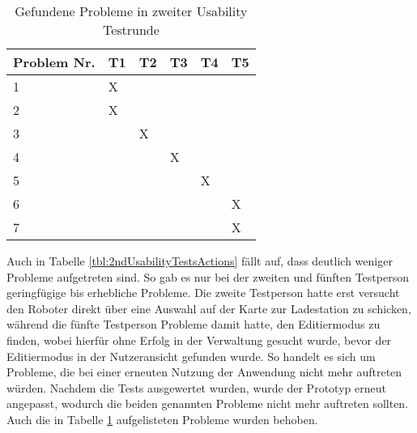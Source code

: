 \begin{table}[H]
    \caption{Gefundene Probleme in zweiter Usability Testrunde}\label{tbl:2ndUsabilityTestsProblems}
    \begin{tabular}{l|l|l|l|l|l}
        Problem Nr. & T1    & T2    & T3    & T4    & T5    \\ \hline
        1           & X     &       &       &       &       \\
        2           & X     &       &       &       &       \\
        3           &       & X     &       &       &       \\
        4           &       &       & X     &       &       \\
        5           &       &       &       & X     &       \\
        6           &       &       &       &       & X     \\
        7           &       &       &       &       & X     \\
    \end{tabular}    
\end{table}

Auch in Tabelle \ref{tbl:2ndUsabilityTestsActions} fällt auf, dass deutlich weniger Probleme aufgetreten sind. So gab es nur bei der zweiten und fünften Testperson geringfügige bis erhebliche Probleme. Die zweite Testperson hatte erst versucht den Roboter direkt über eine Auswahl auf der Karte zur Ladestation zu schicken, während die fünfte Testperson Probleme damit hatte, den Editiermodus zu finden, wobei hierfür ohne Erfolg in der Verwaltung gesucht wurde, bevor der Editiermodus in der Nutzeransicht gefunden wurde. So handelt es sich um Probleme, die bei einer erneuten Nutzung der Anwendung nicht mehr auftreten würden. Nachdem die Tests ausgewertet wurden, wurde der Prototyp erneut angepasst, wodurch die beiden genannten Probleme nicht mehr auftreten sollten. Auch die in Tabelle \ref{tbl:2ndUsabilityTestsProblems} aufgelisteten Probleme wurden behoben.

